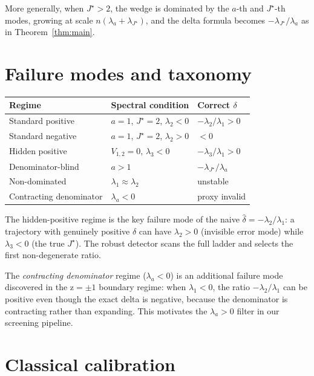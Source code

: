 \documentclass[11pt]{article}
\begin{document}
More generally, when $J^\star > 2$, the wedge is dominated by the $a$-th and $J^\star$-th modes, growing at scale $n(\lambda_a + \lambda_{J^\star})$, and the delta formula becomes $-\lambda_{J^\star}/\lambda_a$ as in Theorem~\ref{thm:main}.

\section{Failure modes and taxonomy}

\begin{center}
\begin{tabular}{lll}
\toprule
Regime & Spectral condition & Correct $\delta$ \\
\midrule
Standard positive & $a{=}1$, $J^\star{=}2$, $\lambda_2 < 0$ & $-\lambda_2/\lambda_1 > 0$ \\
Standard negative & $a{=}1$, $J^\star{=}2$, $\lambda_2 > 0$ & $< 0$ \\
Hidden positive & $V_{1,2}{=}0$, $\lambda_3 < 0$ & $-\lambda_3/\lambda_1 > 0$ \\
Denominator-blind & $a > 1$ & $-\lambda_{J^\star}/\lambda_a$ \\
Non-dominated & $\lambda_1 \approx \lambda_2$ & unstable \\
Contracting denominator & $\lambda_a < 0$ & proxy invalid \\
\bottomrule
\end{tabular}
\end{center}

The hidden-positive regime is the key failure mode of the naive $\hat\delta = -\lambda_2/\lambda_1$: a trajectory with genuinely positive $\delta$ can have $\lambda_2 > 0$ (invisible error mode) while $\lambda_3 < 0$ (the true $J^\star$). The robust detector scans the full ladder and selects the first non-degenerate ratio.

The \emph{contracting denominator} regime ($\lambda_a < 0$) is an additional failure mode discovered in the z$=\pm 1$ boundary regime: when $\lambda_1 < 0$, the ratio $-\lambda_2/\lambda_1$ can be positive even though the exact delta is negative, because the denominator is contracting rather than expanding. This motivates the $\lambda_a > 0$ filter in our screening pipeline.

\section{Classical calibration}
\label{sec:calibration}
\end{document}
